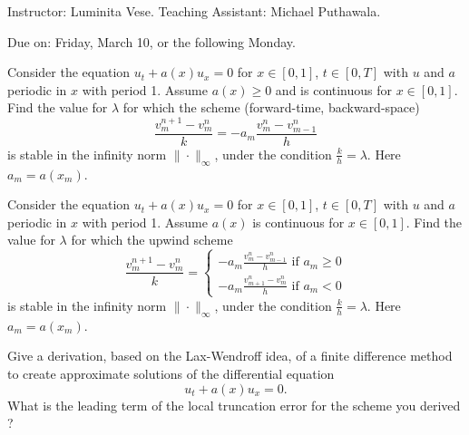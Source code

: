 \documentclass[12pt]{article}
\begin{document}
 Instructor: Luminita Vese. Teaching Assistant: Michael Puthawala. 

 Due on: Friday, March 10, or the following Monday. 

\medbreak





\noindent{\bf [1]} Consider the equation 
$u_t+ a(x)u_x = 0$ for $x \in [0, 1]$, $t \in [0, T]$ with $u$ and $a$ periodic in $x$ with period 1. Assume
$a(x) \geq 0$ and is continuous for $x \in [0, 1]$. Find the value for $\lambda$ for which the scheme (forward-time, backward-space) 
$$\frac{v^{n+1}_m-v^n_m}{k}=-a_m\frac{v_m^n-v_{m-1}^n}{h}$$
is stable in the infinity norm $\|\cdot\|_{\infty}$, under the condition
$\frac{k}{h}=\lambda$. 
Here $a_m = a(x_m)$.

\medbreak

\noindent{\bf [2]} Consider the equation 
$u_t+ a(x)u_x = 0$ for $x \in [0, 1]$, $t \in [0, T]$ with $u$ and $a$ periodic in $x$ with period 1. Assume
$a(x)$ is continuous for $x \in [0, 1]$. Find the value for $\lambda$ for which the upwind scheme 
$$\frac{v^{n+1}_m-v^n_m}{k}=
\left\{ 
\begin{array}{l}
-a_m\frac{v_m^n-v_{m-1}^n}{h} \mbox{ if } a_m\geq0\\
-a_m\frac{v_{m+1}^n-v_{m}^n}{h} \mbox{ if } a_m<0
\end{array}
\right.
$$
is stable in the infinity norm $\|\cdot\|_{\infty}$, under the condition
$\frac{k}{h}=\lambda$. 
Here $a_m = a(x_m)$.

\medbreak

\noindent{\bf [3]} Give a derivation, based on the Lax-Wendroff idea, of a finite difference method to create approximate solutions of the
differential equation 
$$u_t+a(x)u_x=0.$$ 
What is the leading term of the local truncation error for the scheme you derived ?
\end{document}
